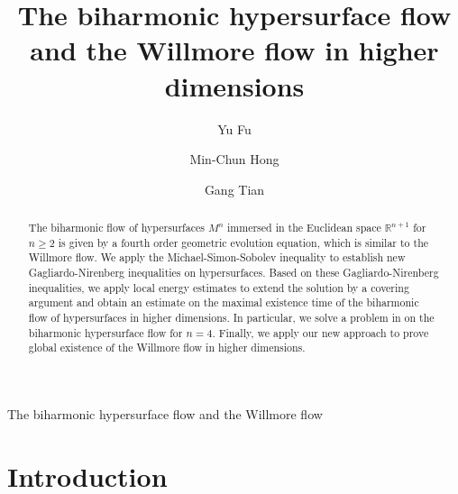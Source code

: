 \documentclass{amsart}
\theoremstyle{definition}
\numberwithin{equation}{section}
\begin{document}
\title{The   biharmonic hypersurface flow   and  the Willmore flow in  higher dimensions}

 \author{Yu Fu}
\address{Center of Applied Mathematics, Dongbei University of Finance and
Economics, Dalian 116025, P. R. China}
\author{Min-Chun Hong}
\address{Department of Mathematics, The University of Queensland, Brisbane,
QLD 4072, Australia}
\author{Gang Tian}
\address{Beijing International Center for Mathematical Research,
 Peking University,
 Beijing, 100871
 P.R.China}






\begin{abstract}
 The   biharmonic  flow of  hypersurfaces $M^n$
immersed in  the Euclidean space $\mathbb {R}^{n+1}$ for $n\geq 2$ is given by a fourth order
geometric
evolution equation, which is similar to
the Willmore flow. We apply the Michael-Simon-Sobolev inequality to  establish    new
Gagliardo-Nirenberg inequalities on hypersurfaces.  Based on these
Gagliardo-Nirenberg inequalities,   we apply   local energy estimates to extend the solution  by a  covering argument  and obtain an estimate on the  maximal  existence time  of  the  biharmonic  flow of  hypersurfaces in  higher dimensions.
In particular, we
solve a problem in \cite{BWW} on the biharmonic hypersurface  flow for $n=4$. Finally, we apply our new approach  to prove global existence of
the Willmore flow  in  higher dimensions.
\end{abstract}

\maketitle {} {The biharmonic hypersurface flow and  the Willmore flow }


\section{Introduction}
\hspace*{\parindent}
\end{document}
